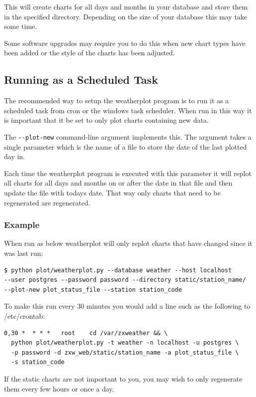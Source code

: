 \documentclass[a4paper,10pt,draft]{book}
\begin{document}
This will create charts for all days and months in your database and store them in the specified directory. Depending on the size of your database this may take some time.

Some software upgrades may require you to do this when new chart types have been added or the style of the charts has been adjusted.

\subsection{Running as a Scheduled Task}

The recommended way to setup the weatherplot program is to run it as a scheduled task from cron or the windows task scheduler. When run in this way it is important that it be set to only plot charts containing new data.

The \verb|--plot-new| command-line argument implements this. The argument takes a single parameter which is the name of a file to store the date of the last plotted day in.

Each time the weatherplot program is executed with this parameter it will replot all charts for all days and months on or after the date in that file and then update the file with todays date. That way only charts that need to be regenerated are regenerated.

\subsubsection{Example}

When run as below weatherplot will only replot charts that have changed since it was last run:
\begin{verbatim}
$ python plot/weatherplot.py --database weather --host localhost
--user postgres --password password --directory static/station_name/
--plot-new plot_status_file --station station_code
\end{verbatim}

To make this run every 30 minutes you would add a line such as the following to /etc/crontab:
\begin{verbatim}
0,30 *  * * *   root    cd /var/zxweather && \
  python plot/weatherplot.py -t weather -n localhost -u postgres \
  -p password -d zxw_web/static/station_name -a plot_status_file \
  -s station_code
\end{verbatim}

If the static charts are not important to you, you may wish to only regenerate them every few hours or once a day.
\end{document}
